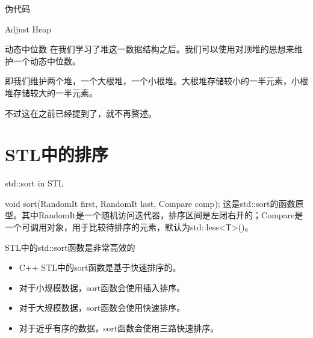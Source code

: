 \documentclass{ldr-simple-gray}
\begin{document}
  \begin{frame}{伪代码}
    \begin{algorithm}[H]
      \caption{Adjust Heap}
      \begin{algorithmic}[1]
          \ENDIF
          \ENDIF
        \ENDFOR
      \end{algorithmic}
    \end{algorithm}
  \end{frame}
  \begin{frame}{动态中位数}
    在我们学习了堆这一数据结构之后。我们可以使用对顶堆的思想来维护一个动态中位数。\newline

    即我们维护两个堆，一个大根堆，一个小根堆。大根堆存储较小的一半元素，小根堆存储较大的一半元素。\newline

    不过这在之前已经提到了，就不再赘述。
  \end{frame}

  \section{STL中的排序}
  \begin{frame}{std::sort in STL}
    \begin{block}{void sort(RandomIt first, RandomIt last, Compare comp);}
      这是std::sort的函数原型。其中RandomIt是一个随机访问迭代器，排序区间是左闭右开的；Compare是一个可调用对象，用于比较待排序的元素，默认为std::less<T>()。
    \end{block}

    \begin{block}{STL中的std::sort函数是非常高效的}
      \begin{itemize}
        \item C++ STL中的sort函数是基于快速排序的。
        \item 对于小规模数据，sort函数会使用插入排序。
        \item 对于大规模数据，sort函数会使用快速排序。
        \item 对于近乎有序的数据，sort函数会使用三路快速排序。
      \end{itemize}
    \end{block}
  \end{frame}
\end{document}
